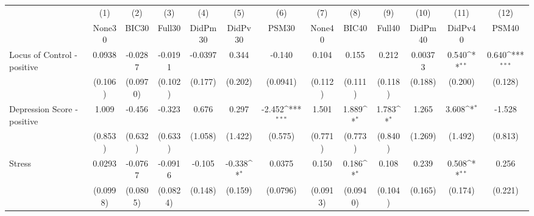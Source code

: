 {
\def\sym#1{\ifmmode^{#1}\else\(^{#1}\)\fi}
\begin{tabular}{l*{12}{c}}
\toprule
            &\multicolumn{1}{c}{(1)}&\multicolumn{1}{c}{(2)}&\multicolumn{1}{c}{(3)}&\multicolumn{1}{c}{(4)}&\multicolumn{1}{c}{(5)}&\multicolumn{1}{c}{(6)}&\multicolumn{1}{c}{(7)}&\multicolumn{1}{c}{(8)}&\multicolumn{1}{c}{(9)}&\multicolumn{1}{c}{(10)}&\multicolumn{1}{c}{(11)}&\multicolumn{1}{c}{(12)}\\
            &\multicolumn{1}{c}{None30}&\multicolumn{1}{c}{BIC30}&\multicolumn{1}{c}{Full30}&\multicolumn{1}{c}{DidPm30}&\multicolumn{1}{c}{DidPv30}&\multicolumn{1}{c}{PSM30}&\multicolumn{1}{c}{None40}&\multicolumn{1}{c}{BIC40}&\multicolumn{1}{c}{Full40}&\multicolumn{1}{c}{DidPm40}&\multicolumn{1}{c}{DidPv40}&\multicolumn{1}{c}{PSM40}\\
\midrule
Locus of Control - positive&      0.0938         &     -0.0287         &     -0.0191         &     -0.0397         &       0.344         &      -0.140         &       0.104         &       0.155         &       0.212         &     0.00373         &       0.540\sym{**} &       0.640\sym{***}\\
            &     (0.106)         &    (0.0970)         &     (0.102)         &     (0.177)         &     (0.202)         &    (0.0941)         &     (0.112)         &     (0.111)         &     (0.118)         &     (0.188)         &     (0.200)         &     (0.128)         \\
\addlinespace
Depression Score - positive&       1.009         &      -0.456         &      -0.323         &       0.676         &       0.297         &      -2.452\sym{***}&       1.501         &       1.889\sym{*}  &       1.783\sym{*}  &       1.265         &       3.608\sym{*}  &      -1.528         \\
            &     (0.853)         &     (0.632)         &     (0.633)         &     (1.058)         &     (1.422)         &     (0.575)         &     (0.771)         &     (0.773)         &     (0.840)         &     (1.269)         &     (1.492)         &     (0.813)         \\
\addlinespace
Stress      &      0.0293         &     -0.0767         &     -0.0916         &      -0.105         &      -0.338\sym{*}  &      0.0375         &       0.150         &       0.186\sym{*}  &       0.108         &       0.239         &       0.508\sym{**} &       0.256         \\
            &    (0.0998)         &    (0.0805)         &    (0.0824)         &     (0.148)         &     (0.159)         &    (0.0796)         &    (0.0913)         &    (0.0940)         &     (0.104)         &     (0.165)         &     (0.174)         &     (0.221)         \\

\end{tabular}}
